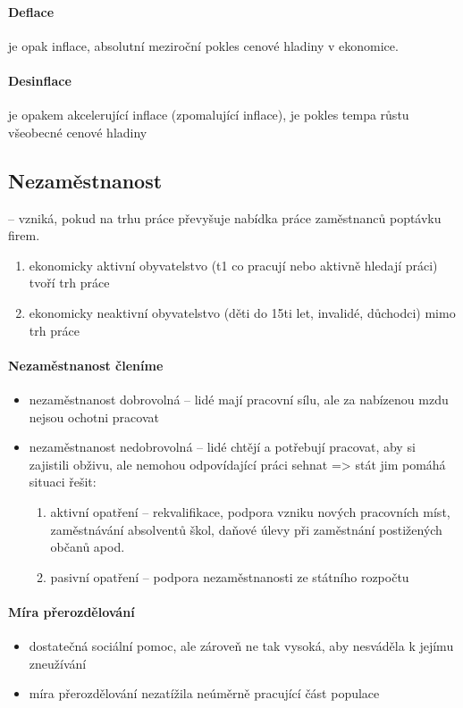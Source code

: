 \paragraph{Deflace} je opak inflace, absolutní meziroční pokles cenové hladiny v ekonomice.

\paragraph{Desinflace} je opakem akcelerující inflace (zpomalující inflace), je pokles tempa růstu všeobecné cenové hladiny

\subsection{Nezaměstnanost} -- vzniká, pokud na trhu práce převyšuje nabídka práce zaměstnanců poptávku firem.
\begin{enumerate}
    \item ekonomicky aktivní obyvatelstvo (t1 co pracují nebo aktivně hledají práci) tvoří trh práce
    \item ekonomicky neaktivní obyvatelstvo (děti do 15ti let, invalidé, důchodci) mimo trh práce
\end{enumerate}

\paragraph{Nezaměstnanost členíme}
\begin{itemize}
    \item nezaměstnanost dobrovolná -- lidé mají pracovní sílu, ale za nabízenou mzdu nejsou ochotni pracovat
    \item nezaměstnanost nedobrovolná -- lidé chtějí a potřebují pracovat, aby si zajistili obživu, ale nemohou odpovídající práci sehnat => stát jim pomáhá situaci řešit:
        \begin{enumerate}
            \item aktivní opatření -- rekvalifikace, podpora vzniku nových pracovních míst, zaměstnávání absolventů škol, daňové úlevy při zaměstnání postižených občanů apod.
            \item pasivní opatření -- podpora nezaměstnanosti ze státního rozpočtu
        \end{enumerate}
\end{itemize}

\paragraph{Míra přerozdělování}
\begin{itemize}
    \item dostatečná sociální pomoc, ale zároveň ne tak vysoká, aby nesváděla k jejímu zneužívání
    \item míra přerozdělování nezatížila neúměrně pracující část populace
\end{itemize}

